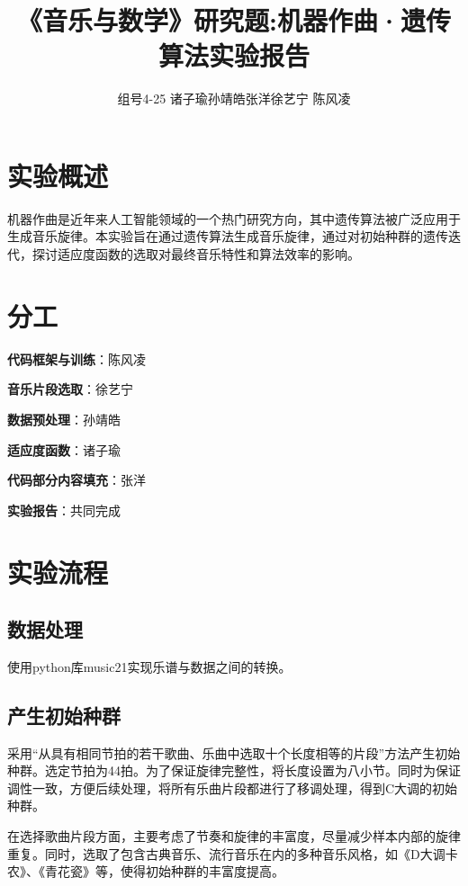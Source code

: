 \documentclass{article}
\begin{document}
\title{ \textbf{《音乐与数学》研究题:机器作曲·遗传算法\quad 实验报告}}
\author{组号4-25 \quad 
诸子瑜\quad 孙靖皓\quad 张洋\quad 徐艺宁 \quad 陈风凌}

\maketitle

\begin{center}
\tableofcontents
\end{center}

\newpage


\section{实验概述}

机器作曲是近年来人工智能领域的一个热门研究方向，其中遗传算法被广泛应用于生成音乐旋律。本实验旨在通过遗传算法生成音乐旋律，通过对初始种群的遗传迭代，探讨适应度函数的选取对最终音乐特性和算法效率的影响。

\section{分工}

\textbf{代码框架与训练}：陈风凌

\textbf{音乐片段选取}：徐艺宁

\textbf{数据预处理}：孙靖皓

\textbf{适应度函数}：诸子瑜

\textbf{代码部分内容填充}：张洋

\textbf{实验报告}：共同完成
\section{实验流程}
\subsection{数据处理}
使用python库music21实现乐谱与数据之间的转换。

\subsection{产生初始种群}
采用“从具有相同节拍的若干歌曲、乐曲中选取十个长度相等的片段”方法产生初始种群。选定节拍为44拍。为了保证旋律完整性，将长度设置为八小节。同时为保证调性一致，方便后续处理，将所有乐曲片段都进行了移调处理，得到C大调的初始种群。

在选择歌曲片段方面，主要考虑了节奏和旋律的丰富度，尽量减少样本内部的旋律重复。同时，选取了包含古典音乐、流行音乐在内的多种音乐风格，如《D大调卡农》、《青花瓷》等，使得初始种群的丰富度提高。
\end{document}
